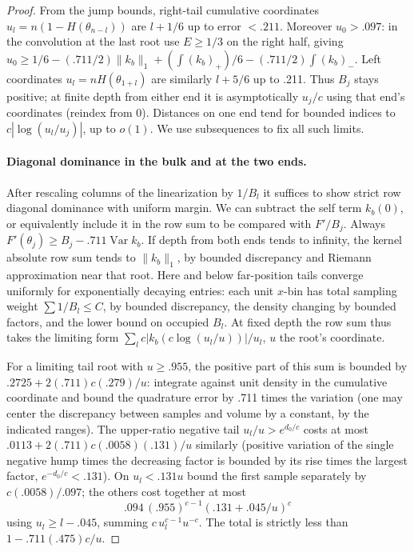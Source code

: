 \begin{proof}
From the jump bounds, right-tail cumulative coordinates \(u_l=n(1-H(\theta_{n-l}))\) are \(l+1/6\) up to error \(<.211\). Moreover \(u_0>.097\): in the convolution at the last root use \(E\ge1/3\) on the right half, giving
\(u_0\ge1/6-(.711/2)\|k_b\|_1+(\int(k_b)_+)/6-(.711/2)\int(k_b)_-\).
Left coordinates \(u_l=nH(\theta_{1+l})\) are similarly \(l+5/6\) up to .211. Thus \(B_j\) stays positive; at finite depth from either end it is asymptotically \(u_j/c\) using that end's coordinates (reindex from 0). Distances on one end tend for bounded indices to \(c|\log(u_l/u_j)|\), up to \(o(1)\). We use subsequences to fix all such limits.

\paragraph{Diagonal dominance in the bulk and at the two ends.}
After rescaling columns of the linearization by \(1/B_l\) it suffices to show strict row diagonal dominance with uniform margin. We can subtract the self term \(k_b(0)\), or equivalently include it in the row sum to be compared with \(F'/B_j\). Always \(F'(\theta_j)\ge B_j-.711\operatorname{Var} k_b\). If depth from both ends tends to infinity, the kernel absolute row sum tends to \(\|k_b\|_1\), by bounded discrepancy and Riemann approximation near that root. Here and below far-position tails converge uniformly for exponentially decaying entries: each unit \(x\)-bin has total sampling weight \(\sum 1/B_l\le C\), by bounded discrepancy, the density changing by bounded factors, and the lower bound on occupied \(B_l\). At fixed depth the row sum thus takes the limiting form
\(\sum_l c |k_b(c\log(u_l/u))|/u_l\), \(u\) the root's coordinate.

For a limiting tail root with \(u\ge .955\), the positive part of this sum is bounded by
\(.2725+2(.711)c(.279)/u\): integrate against unit density in the cumulative coordinate and bound the quadrature error by .711 times the variation (one may center the discrepancy between samples and volume by a constant, by the indicated ranges). The upper-ratio negative tail \(u_l/u>e^{d_0/c}\) costs at most
\(.0113+2(.711)c(.0058)(.131)/u\) similarly (positive variation of the single negative hump times the decreasing factor is bounded by its rise times the largest factor, \(e^{-d_0/c}<.131\)). On \(u_l<.131u\) bound the first sample separately by \(c(.0058)/.097\); the others cost together at most
\[
 .094\,(.955)^{c-1}(.131+.045/u)^c
\]
using \(u_l\ge l-.045\), summing \(c\,u_l^{c-1}u^{-c}\). The total is strictly less than \(1-.711(.475)c/u\). 


\end{proof}
